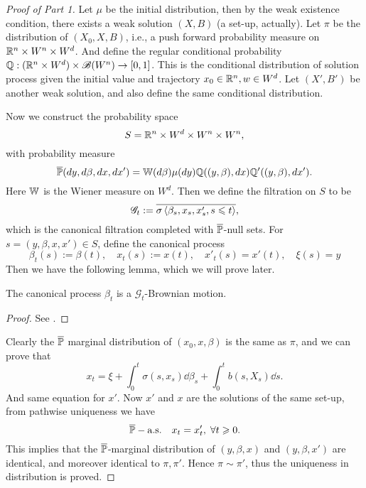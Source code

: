 \documentclass[8pt,onesided]{article}
\begin{document}
\begin{proof}[Proof of Part 1]
Let $\mu$ be the initial distribution, then by the weak existence condition, there exists a weak solution $(X,B)$ (a set-up, actually). Let $\pi$ be the distribution of $(X_0,X,B)$, i.e., a push forward probability measure on $ \mathbb{R}^n \times W^n \times W^d$. And define the regular conditional probability $\mathbb{Q}: (\mathbb{R}^n\times W^d) \times \mathscr{B}(W^n)\to [0,1]$. This is the conditional distribution of solution process given the initial value and trajectory $x_0 \in \mathbb{R}^n , w \in W^d$. Let $(X',B')$ be another weak solution, and also define the same conditional distribution. 

Now we construct the probability space
\begin{equation*}
    S=\mathbb{R}^n \times W^d \times W^n \times W^n,
\end{equation*}
with probability measure
\begin{equation*}
    \overline{\mathbb{P}}(dy,d\beta, dx, dx')=\mathbb{W}(d\beta) \mu(dy)  \mathbb{Q}((y,\beta), dx) \mathbb{Q'}((y,\beta), dx').
\end{equation*}
Here $\mathbb{W}$ is the Wiener measure on $W^d$. Then we define the filtration on $S$ to be
\begin{equation*}
    \mathscr{G}_t:= \overline{\sigma \left\langle \beta_s, x_s, x'_s, s\leqslant t\right\rangle},
\end{equation*}
which is the canonical filtration completed with $\overline{\mathbb{P}}$-null sets. For $s=(y,\beta,x,x')\in S$, define the canonical process
\begin{equation*}
    \beta_t(s):=\beta(t),\quad x_t(s):=x(t), \quad x'_t(s)=x'(t), \quad \xi(s)=y
\end{equation*}
Then we have the following lemma, which we will prove later. 

\begin{lemma}
    The canonical process $\beta_t$ is a $\mathscr{G}_t$-Brownian motion. 
\end{lemma}
\begin{proof}
    See \cite[Lemma 17.12]{rogers2000diffusions2}.
\end{proof}

Clearly the $\overline{\mathbb{P}}$ marginal distribution of $(x_0,x,\beta)$ is the same as $\pi$, and we can prove that
\begin{equation*}
    x_t=\xi+\int_0^t \sigma(s,x_s) \dd \beta_s+\int_0^t b(s,X_s) \dd s.
\end{equation*}
And same equation for $x'$. Now $x'$ and $x$ are the solutions of the same set-up, from pathwise uniqueness we have
\begin{equation*}
    \overline{\mathbb{P}}-\text{a.s.}  \quad x_t=x'_t,\; \forall t\geqslant 0.
\end{equation*}
This implies that the $\overline{\mathbb{P}}$-marginal distribution of $(y,\beta,x)$ and $( y,\beta,x')$ are identical, and moreover identical to $\pi, \pi'$. Hence $\pi\sim \pi'$, thus the uniqueness in distribution is proved.
\end{proof}
\end{document}
